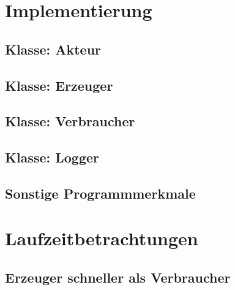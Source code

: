 \section{Implementierung} %
\label{sec:implementierung}

\subsection{Klasse: Akteur} %
\label{sub:klasse_akteur}


\subsection{Klasse: Erzeuger} %
\label{sub:klasse_erzeuger}


\subsection{Klasse: Verbraucher} %
\label{sub:klasse_verbraucher}


\subsection{Klasse: Logger} %
\label{sub:klasse_logger}


\subsection{Sonstige Programmmerkmale} %
\label{sub:sonstige_programmmerkmale}


\newpage
\section{Laufzeitbetrachtungen} %
\label{sec:laufzeitbetrachtungen}

\subsection{Erzeuger schneller als Verbraucher} %
\label{sub:erzeuger_schneller_als_verbraucher}

